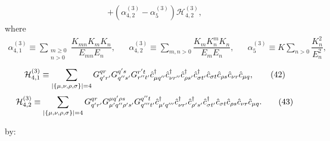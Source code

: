 \documentclass[preprint,showkeys,nofootinbib]{revtex4-1}
\newcommand{\f}{\dfrac} %
\newcommand{\p}[1]{\left(#1\right)} %
\renewcommand{\set}[1]{\left\{#1\right\}} %
\renewcommand{\c}{\hat{c}}
\newcommand{\n}{\hat{n}}
\renewcommand{\H}{\mathcal{H}}
\newcommand{\1}{\mathds{1}}
\begin{document}
\begin{enumerate}
{\begin{align}
      + \p{\alpha_{4,2}^{(3)} - \alpha_5^{(3)}} \H_{4,2}^{(3)},
      \tag{40}
    \end{align}
    where
    \begin{align}
      \alpha_{4,1}^{(3)}
      \equiv \sum_{\substack{m\ge0\\n>0}} \f{K_{mn} K_m K_n}{E_{mn} E_n},
      &&
      \alpha_{4,2}^{(3)}
      \equiv \sum_{m,n>0} \f{K_m K^m_n K_n}{E_m E_n},
      &&
      \alpha_5^{(3)}
      \equiv  K \sum_{n>0} \f{K_n^2}{E_n^2},
      \tag{41}
    \end{align}
    \begin{align}
      \H_{4,1}^{(3)}
      \equiv \sum_{\abs{\set{\mu,\nu,\rho,\sigma}}=4}
      G^{qr}_{q'r'} G^{q's}_{q''s'} G^{r't}_{r''t'}
      \c_{\mu q''}^\dag \c_{\nu r''}^\dag
      \c_{\rho s'}^\dag \c_{\sigma t'}^\dag
      \c_{\sigma t} \c_{\rho s} \c_{\nu r} \c_{\mu q},
      \tag{42}
    \end{align}
    \begin{align}
      \H_{4,2}^{(3)}
      \equiv \sum_{\abs{\set{\mu,\nu,\rho,\sigma}}=4}
      G^{qr}_{q'r'} G^{\mu q'\rho s}_{\mu'q''\rho's'} G^{q''t}_{q'''t'}
      \c_{\mu'q'''}^\dag \c_{\nu r'}^\dag
      \c_{\rho's'}^\dag \c_{\sigma t'}^\dag
      \c_{\sigma t} \c_{\rho s} \c_{\nu r} \c_{\mu q}.
      \tag{43}
    \end{align}}

  by:


\end{enumerate}
\end{document}
